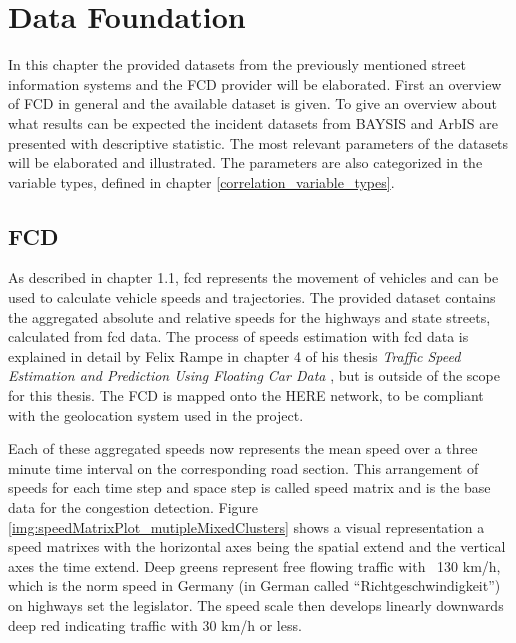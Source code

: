 \chapter{Data Foundation}
\label{data}
In this chapter the provided datasets from the previously mentioned street information systems and the FCD provider will be elaborated. First an overview of FCD in general and the available dataset is given. To give an overview about what results can be expected the incident datasets from BAYSIS and ArbIS are presented with descriptive statistic. The most relevant parameters of the datasets will be elaborated and illustrated. The parameters are also categorized in the variable types, defined in chapter \autoref{correlation_variable_types}.

\section{FCD}
\label{dataset_fcd}
 
As described in chapter 1.1, \acrshort{fcd} represents the movement of vehicles and can be used to calculate vehicle speeds and trajectories. The provided dataset contains the aggregated absolute and relative speeds for the highways and state streets, calculated from \acrshort{fcd} data. The process of speeds estimation with \acrshort{fcd} data is explained in detail by Felix Rampe in chapter 4 of his thesis \textit{Traffic Speed Estimation and Prediction Using Floating Car Data} \parencite{Rempe2018}, but is outside of the scope for this thesis. The FCD is mapped onto the HERE \parencite{HERE2020} network, to be compliant with the geolocation system used in the project.


Each of these aggregated speeds now represents the mean speed over a three minute time interval on the corresponding road section. This arrangement of speeds for each time step and space step is called speed matrix and is the base data for the congestion detection. Figure \autoref{img:speedMatrixPlot_mutipleMixedClusters} shows a visual representation a speed matrixes with the horizontal axes being the spatial extend and the vertical axes the time extend. Deep greens represent free flowing traffic with ~130 km/h, which is the norm speed in Germany (in German called “Richtgeschwindigkeit”) on highways set the legislator. The speed scale then develops linearly downwards deep red indicating traffic with 30 km/h or less. 

